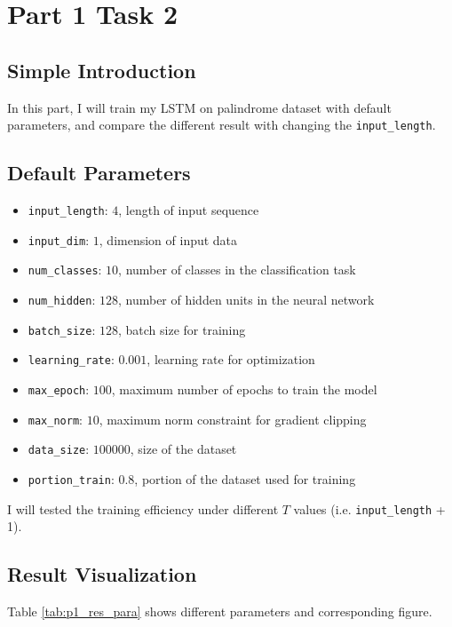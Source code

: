 \section{Part 1 Task 2}

\subsection{Simple Introduction}

In this part, I will train my LSTM on palindrome dataset with default parameters, and compare the different result with changing the \texttt{input\_length}.

\subsection{Default Parameters}

\begin{itemize}
  \item \texttt{input\_length}: $4$, length of input sequence
  \item \texttt{input\_dim}: $1$, dimension of input data
  \item \texttt{num\_classes}: $10$, number of classes in the classification task
  \item \texttt{num\_hidden}: $128$, number of hidden units in the neural network
  \item \texttt{batch\_size}: $128$, batch size for training
  \item \texttt{learning\_rate}: $0.001$, learning rate for optimization
  \item \texttt{max\_epoch}: $100$, maximum number of epochs to train the model
  \item \texttt{max\_norm}: $10$, maximum norm constraint for gradient clipping
  \item \texttt{data\_size}: $100000$, size of the dataset
  \item \texttt{portion\_train}: $0.8$, portion of the dataset used for training
\end{itemize}

I will tested the training efficiency under different $T$ values (i.e. \texttt{input\_length} + 1).

\subsection{Result Visualization}

Table \ref{tab:p1_res_para} shows different parameters and corresponding figure.

